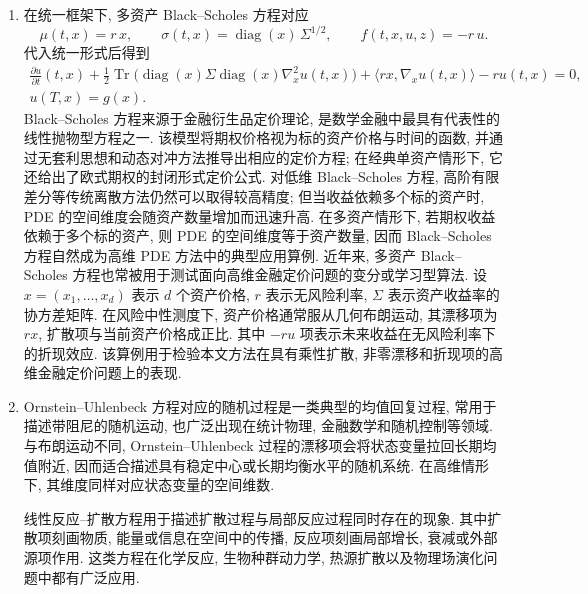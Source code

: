 \begin{enumerate}
        \item
        在统一框架下, 多资产 Black--Scholes 方程对应
        \begin{equation*}
          \mu(t, x) = r\,x,\qquad
          \sigma(t, x) = \operatorname{diag}(x)\, \Sigma^{1/2},\qquad
          f(t, x, u, z) = -r\,u.
        \end{equation*}
        代入统一形式后得到
        \begin{gather*}
          \frac{\partial u}{\partial t}(t,x)
          + \frac{1}{2}\operatorname{Tr}\!\big(
          \operatorname{diag}(x)\Sigma\operatorname{diag}(x)\nabla_x^2 u(t,x)
          \big)
          + \langle r x,\nabla_x u(t,x)\rangle
          - r u(t,x)
          = 0, \\
          u(T,x) = g(x).
        \end{gather*}
        Black--Scholes 方程来源于金融衍生品定价理论, 是数学金融中最具有代表性的线性抛物型方程之一.
        该模型将期权价格视为标的资产价格与时间的函数, 并通过无套利思想和动态对冲方法推导出相应的定价方程;
        在经典单资产情形下, 它还给出了欧式期权的封闭形式定价公式\cite{scholesPricingOptionsCorporate}.
        对低维 Black--Scholes 方程, 高阶有限差分等传统离散方法仍然可以取得较高精度;
        但当收益依赖多个标的资产时, PDE 的空间维度会随资产数量增加而迅速升高\cite{huHighOrderMethod2018}.
        在多资产情形下, 若期权收益依赖于多个标的资产, 则 PDE 的空间维度等于资产数量,
        因而 Black--Scholes 方程自然成为高维 PDE 方法中的典型应用算例.
        近年来, 多资产 Black--Scholes 方程也常被用于测试面向高维金融定价问题的变分或学习型算法\cite{zhaoQuantuminspiredVariationalAlgorithms2024}.
        设 $x=(x_{1},\ldots,x_{d})$ 表示 $d$ 个资产价格, $r$ 表示无风险利率, $\Sigma$ 表示资产收益率的协方差矩阵.
        在风险中性测度下, 资产价格通常服从几何布朗运动, 其漂移项为 $r x$, 扩散项与当前资产价格成正比.
        其中 $-r u$ 项表示未来收益在无风险利率下的折现效应.
        该算例用于检验本文方法在具有乘性扩散, 非零漂移和折现项的高维金融定价问题上的表现.

        \item
        Ornstein--Uhlenbeck 方程对应的随机过程是一类典型的均值回复过程,
        常用于描述带阻尼的随机运动, 也广泛出现在统计物理, 金融数学和随机控制等领域.
        与布朗运动不同, Ornstein--Uhlenbeck 过程的漂移项会将状态变量拉回长期均值附近,
        因而适合描述具有稳定中心或长期均衡水平的随机系统.
        在高维情形下, 其维度同样对应状态变量的空间维数.

        线性反应--扩散方程用于描述扩散过程与局部反应过程同时存在的现象.
        其中扩散项刻画物质, 能量或信息在空间中的传播, 反应项刻画局部增长, 衰减或外部源项作用.
        这类方程在化学反应, 生物种群动力学, 热源扩散以及物理场演化问题中都有广泛应用.
      \end{enumerate}


